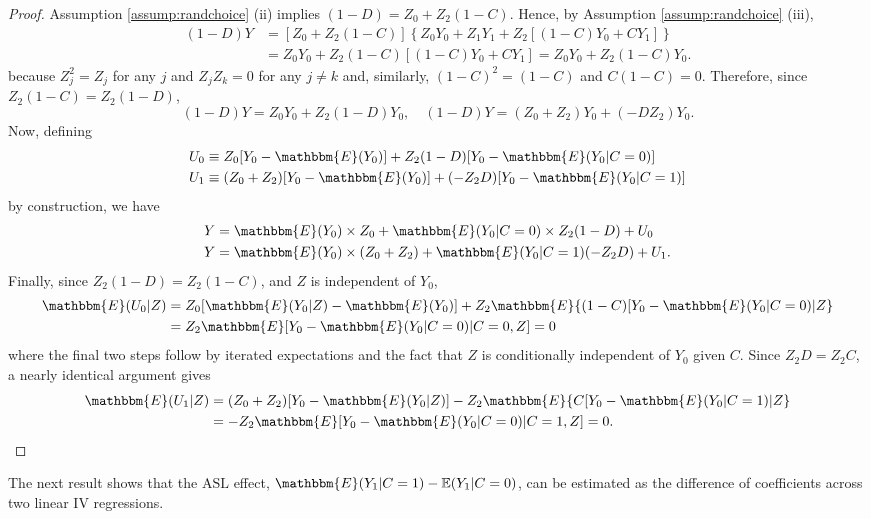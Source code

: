 \begin{proof}
Assumption \ref{assump:randchoice} (ii) implies $(1 - D) = Z_0 + Z_2(1 - C)$. Hence, by Assumption \ref{assump:randchoice} (iii),
\begin{align*}
(1 - D)Y &=  [Z_0 + Z_2 (1 - C)]\left\{Z_0 Y_0 + Z_1 Y_1 + Z_2[(1 - C) Y_0 + CY_1]\right\}\\
&= Z_0 Y_0 + Z_2 (1 - C) [(1 - C) Y_0 + C Y_1] = Z_0 Y_0 + Z_2 (1 - C) Y_0.
\end{align*}
because $Z_j^2 = Z_j$ for any $j$ and $Z_j Z_k = 0$ for any $j \neq k$ and, similarly, $(1 - C)^2 = (1 - C)$ and $C (1 - C) = 0$.
Therefore, since $Z_2 (1 - C) = Z_2 (1 - D)$,
\[
(1 - D)Y = Z_0 Y_0 + Z_2 (1 - D) Y_0, \quad
(1 - D)Y = (Z_0 + Z_2) Y_0 + (-DZ_2) Y_0. 
\]
Now, defining
\begin{align*}
U_0 &\equiv Z_0 [Y_0 - \mathbbm{E}(Y_0)] + Z_2(1 - D)[Y_0 - \mathbbm{E}(Y_0|C=0)]\\
U_1 &\equiv (Z_0 + Z_2)[Y_0 - \mathbbm{E}(Y_0)] + (-Z_2 D)[Y_0 - \mathbbm{E}(Y_0|C=1)]
\end{align*}
by construction, we have
\begin{align*}
Y &= \mathbbm{E}(Y_0) \times Z_0 + \mathbbm{E}(Y_0|C=0) \times Z_2(1 - D) + U_0\\
Y &= \mathbbm{E}(Y_0) \times (Z_0 + Z_2)+ \mathbbm{E}(Y_0|C=1) (-Z_2D) + U_1.
\end{align*}
Finally, since $Z_2(1-D) = Z_2(1 - C)$, and $Z$ is independent of $Y_0$,  
\begin{align*}
\mathbbm{E}(U_0|Z) &= Z_0[\mathbbm{E}(Y_0|Z) - \mathbbm{E}(Y_0)] + Z_2\mathbbm{E}\{(1 - C) [Y_0 - \mathbbm{E}(Y_0|C=0) |Z\}\\
&= Z_2 \mathbbm{E}[Y_0 - \mathbbm{E}(Y_0|C=0) | C = 0, Z] = 0
\end{align*}
where the final two steps follow by iterated expectations and the fact that  $Z$ is conditionally independent of $Y_0$ given $C$. 
Since $Z_2 D = Z_2 C$, a nearly identical argument gives
\begin{align*}
\mathbbm{E}(U_1|Z) &= (Z_0 + Z_2)[Y_0 - \mathbbm{E}(Y_0|Z)] -Z_2\mathbbm{E}\{C [Y_0 - \mathbbm{E}(Y_0|C=1) |Z\}\\
&= -Z_2 \mathbbm{E}[Y_0 - \mathbbm{E}(Y_0|C=0) | C = 1, Z] = 0. \qedhere
\end{align*}
\end{proof}


The next result shows that the $\text{ASL}$ effect, $\mathbbm{E}(Y_1|C=1) - \mathbb{E}(Y_1|C=0)$, can be estimated as the difference of coefficients across two linear IV regressions.

